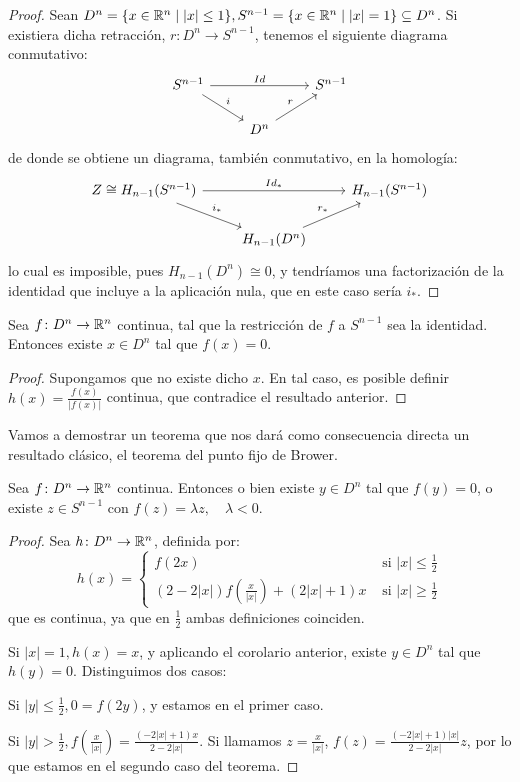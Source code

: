\begin{proof}
  Sean $D^n = \{x \in \mathbb{R}^n \mid |x| \leq 1\}, S^{n-1} = \{x \in \mathbb{R}^n \mid |x| = 1\} \subseteq D^n$. Si existiera dicha retracción,
  $r \colon D^n \to S^{n-1}$, tenemos el siguiente diagrama conmutativo:
  \[ \begin{tikzcd}
    S^{n-1} \arrow{dr}{i} \arrow{rr}{Id} & & S^{n-1} \\
    & D^n \arrow{ur}{r}
  \end{tikzcd} \]
  de donde se obtiene un diagrama, también conmutativo, en la homología:
  \[ \begin{tikzcd}
    Z \cong H_{n-1}(S^{n-1}) \arrow{dr}{i_*} \arrow{rr}{Id_*} & & H_{n-1}(S^{n-1}) \\
    & H_{n-1}(D^n) \arrow{ur}{r_*}
  \end{tikzcd} \]
  lo cual es imposible, pues $H_{n-1}(D^n) \cong 0$, y tendríamos una factorización de la identidad que incluye a la aplicación nula,
  que en este caso sería $i_*$.
\end{proof}

\begin{corollary}
  Sea $f \colon D^n \to \mathbb{R}^n$ continua, tal que la restricción de $f$ a $S^{n-1}$ sea la identidad.
  Entonces existe $x \in D^n$ tal que $f(x) = 0$.
\end{corollary}

\begin{proof}
  Supongamos que no existe dicho $x$. En tal caso, es posible definir $h(x) = \frac{f(x)}{|f(x)|}$
  continua, que contradice el resultado anterior.
\end{proof}

Vamos a demostrar un teorema que nos dará como consecuencia directa un resultado clásico, el teorema
del punto fijo de Brower.

\begin{theorem}
  Sea $f \colon D^n \to \mathbb{R}^n$ continua. Entonces o bien existe $y \in D^n$ tal que $f(y) = 0$, o existe
  $z \in S^{n-1}$ con $f(z) = \lambda z, \quad \lambda < 0$.
\end{theorem}

\begin{proof}
  Sea $h \colon D^n \to \mathbb{R}^n$, definida por:
  \[ h(x) = \begin{cases} f(2x) &\text{ si } |x| \leq \frac{1}{2} \\
                          (2-2|x|)f(\frac{x}{|x|}) + (2|x| + 1)x &\text{ si } |x| \geq \frac{1}{2}  \end{cases} \]
  que es continua, ya que en $\frac{1}{2}$ ambas definiciones coinciden.

  Si $|x| = 1, h(x) = x$, y aplicando el corolario anterior, existe $y \in D^n$ tal que $h(y) = 0$. Distinguimos dos casos:

  Si $|y| \leq \frac{1}{2}, 0 = f(2y)$, y estamos en el primer caso.

  Si $|y| > \frac{1}{2}, f(\frac{x}{|x|}) = \frac{(-2|x| + 1)x}{2-2|x|}$. Si llamamos $z = \frac{x}{|x|}$,
  $f(z) = \frac{(-2|x|+1)|x|}{2-2|x|} z$, por lo que estamos en el segundo caso del teorema.
\end{proof}

